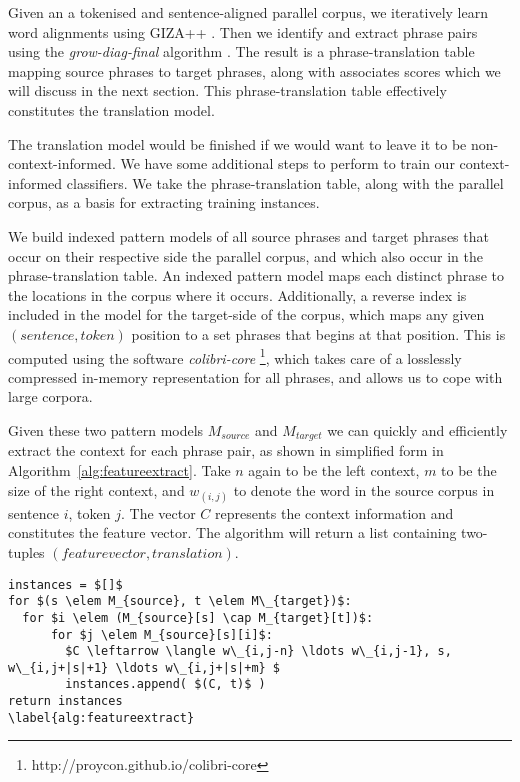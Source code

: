 \documentclass[11pt]{article}
\begin{document}
Given an a tokenised and sentence-aligned parallel corpus, we iteratively learn
word alignments using GIZA++ \citep{GIZA}. Then we identify and extract phrase
pairs using the {\em grow-diag-final}\/ algorithm \citep{OchNey2003}. The
result is a phrase-translation table mapping source phrases to target
phrases, along with associates scores which we will discuss in the next
section. This phrase-translation table effectively constitutes the translation
model.

The translation model would be finished if we would want to leave it to be
non-context-informed. We have some additional steps to perform to train our
context-informed classifiers. We take the phrase-translation table, along with
the parallel corpus, as a basis for extracting training instances.

We build indexed pattern models of all source phrases and target phrases that
occur on their respective side the parallel corpus, and which also occur in the 
phrase-translation table. An indexed pattern model maps each distinct phrase to
the locations in the corpus where it occurs.  Additionally, a reverse index is
included in the model for the target-side of the corpus, which maps any given
$(sentence, token)$ position to a set phrases that begins at that position.
This is computed using the software \emph{colibri-core}
\footnote{http://proycon.github.io/colibri-core}, which takes care of a
losslessly compressed in-memory representation for all phrases, and allows us
to cope with large corpora.

Given these two pattern models $M_{source}$ and $M_{target}$ we can quickly and
efficiently extract the context for each phrase pair, as shown in simplified
form in Algorithm~\ref{alg:featureextract}. Take $n$ again to be the left
context, $m$ to be the size of the right context, and $w_{(i,j)}$ to denote the
word in the source corpus in sentence $i$, token $j$. The vector $C$ represents
the context information and constitutes the feature vector. The algorithm will
return a list containing two-tuples $(feature vector, translation)$.

\begin{lstlisting}
instances = $[]$
for $(s \elem M_{source}, t \elem M\_{target})$:
  for $i \elem (M_{source}[s] \cap M_{target}[t])$:
      for $j \elem M_{source}[s][i]$:
        $C \leftarrow \langle w\_{i,j-n} \ldots w\_{i,j-1}, s, w\_{i,j+|s|+1} \ldots w\_{i,j+|s|+m} $
        instances.append( $(C, t)$ ) 
return instances
\label{alg:featureextract}
\end{lstlisting}
    
\end{document}
